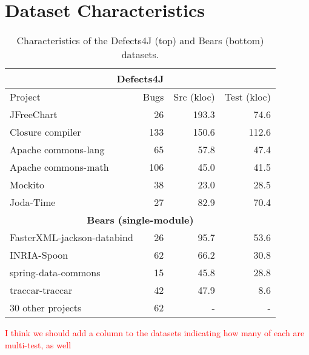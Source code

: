 \documentclass[sigconf, timestamp-false, anonymous=true]{acmart}
\newcommand\todo[1]{\textcolor{red}{#1}}
\begin{document}
\section{Dataset Characteristics}
\label{sec:data-rq1}

\begin{table}
\begin{center}
\begin{tabular}{l | rrr}
\toprule
\multicolumn{4}{c}{\textbf{Defects4J}} \\
\midrule
Project & Bugs & Src (kloc) & Test (kloc) \\
\midrule
JFreeChart  & 26 & 193.3 & 74.6 \\
Closure compiler & 133 & 150.6 & 112.6 \\
Apache commons-lang & 65 & 57.8 & 47.4 \\
Apache commons-math & 106 & 45.0 & 41.5 \\
Mockito & 38 & 23.0 & 28.5 \\
Joda-Time & 27 & 82.9 & 70.4 \\
\midrule
\multicolumn{4}{c}{\textbf{Bears (single-module)}} \\
\midrule
FasterXML-jackson-databind & 26 & 95.7 & 53.6 \\
INRIA-Spoon & 62 & 66.2 & 30.8 \\
spring-data-commons & 15 & 45.8 & 28.8 \\
traccar-traccar & 42 & 47.9 & 8.6 \\
30 other projects & 62 & - & -\\
\bottomrule
\end{tabular}
\end{center}
\caption{\label{tab:data} Characteristics of the Defects4J (top) and Bears (bottom) datasets.}
\end{table}

\todo{I think we should add a column to the datasets indicating how many of each are multi-test, as well} 
\end{document}
